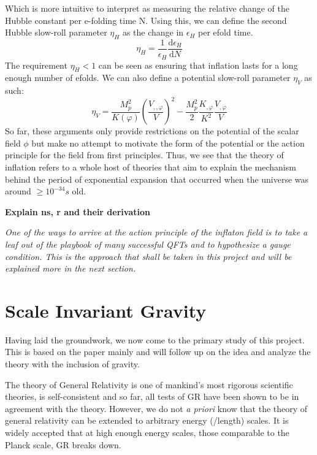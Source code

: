 \documentclass[aps,prd,reprint,preprintnumbers,showpacs,floatfix,nofootinbib,superscript address]{revtex4-2}
\begin{document}
Which is more intuitive to interpret as measuring the relative change of the Hubble constant per e-folding time N. Using this, we can define the second Hubble slow-roll parameter $\eta_H$ as the change in $\epsilon_H$ per efold time.
\begin{equation}
    \eta_H = \frac{1}{\epsilon_H} \frac{\text{d}\epsilon_H}{\text{d}N}
\end{equation}
The requirement $\eta_H < 1$ can be seen as ensuring that inflation lasts for a long enough number of efolds. We can also define a potential slow-roll parameter $\eta_V$ as such:
\begin{equation}
    \eta_V = \frac{M_p^2}{K(\varphi)} \left( \frac{V_{,,\varphi}}{V} \right)^2 - \frac{M_p^2}{2} \frac{K_{,\varphi}}{K^2} \frac{V_{,\varphi}}{V}
\end{equation}
So far, these arguments only provide restrictions on the potential of the scalar field $\phi$ but make no attempt to motivate the form of the potential or the action principle for the field from first principles. Thus, we see that the theory of inflation refers to a whole host of theories that aim to explain the mechanism behind the period of exponential expansion that occurred when the universe was around $\geq 10^{-34}s$ old.

\textbf{Explain ns, r and their derivation}

\textit{One of the ways to arrive at the action principle of the inflaton field is to take a leaf out of the playbook of many successful QFTs and to hypothesize a gauge condition. This is the approach that shall be taken in this project and will be explained more in the next section.}

\section{Scale Invariant Gravity} \label{Scale Invariant Gravity}
Having laid the groundwork, we now come to the primary study of this project. This is based on the paper \cite{barker2024poincaregaugetheoryconformal} mainly and will follow up on the idea and analyze the theory with the inclusion of gravity.

The theory of General Relativity is one of mankind's most rigorous scientific theories, is self-consistent and so far, all tests of GR have been shown to be in agreement with the theory. However, we do not \textit{a priori} know that the theory of general relativity can be extended to arbitrary energy (/length) scales. It is widely accepted that at high enough energy scales, those comparable to the Planck scale, GR breaks down. 
\end{document}
